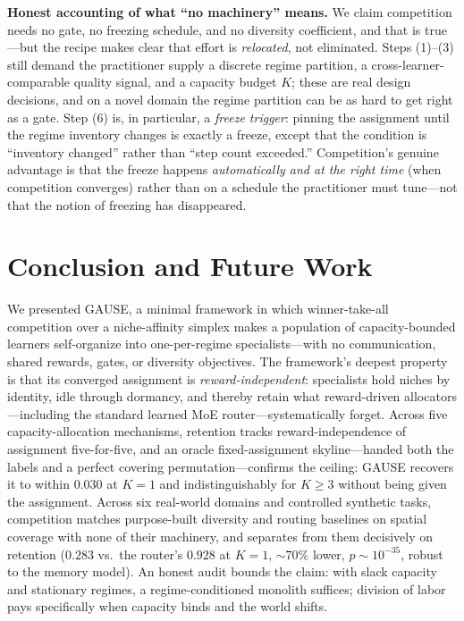 \documentclass[10pt]{article}
\begin{document}
\noindent\textbf{Honest accounting of what ``no machinery'' means.} We claim
competition needs no gate, no freezing schedule, and no diversity coefficient, and
that is true---but the recipe makes clear that effort is \emph{relocated}, not
eliminated. Steps (1)--(3) still demand the practitioner supply a discrete regime
partition, a cross-learner-comparable quality signal, and a capacity budget $K$;
these are real design decisions, and on a novel domain the regime partition can be as
hard to get right as a gate. Step (6) is, in particular, a \emph{freeze trigger}:
pinning the assignment until the regime inventory changes is exactly a freeze, except
that the condition is ``inventory changed'' rather than ``step count exceeded.''
Competition's genuine advantage is that the freeze happens \emph{automatically and at
the right time} (when competition converges) rather than on a schedule the
practitioner must tune---not that the notion of freezing has disappeared.

\section{Conclusion and Future Work}
\label{sec:conclusion}

We presented GAUSE, a minimal framework in which winner-take-all
competition over a niche-affinity simplex makes a population of capacity-bounded
learners self-organize into one-per-regime specialists---with no communication,
shared rewards, gates, or diversity objectives. The framework's deepest property
is that its converged assignment is \emph{reward-independent}: specialists hold
niches by identity, idle through dormancy, and thereby retain what reward-driven
allocators---including the standard learned MoE router---systematically forget.
Across five capacity-allocation mechanisms, retention tracks
reward-independence of assignment five-for-five, and an oracle fixed-assignment
skyline---handed both the labels and a perfect covering permutation---confirms the
ceiling: GAUSE recovers it to within $0.030$ at $K{=}1$ and indistinguishably for
$K\ge3$ without being given the assignment. Across six real-world domains
and controlled synthetic tasks, competition matches purpose-built diversity and
routing baselines on spatial coverage with none of their machinery, and
separates from them decisively on retention ($0.283$ vs.\ the router's $0.928$ at
$K{=}1$, $\sim$70\% lower, $p\sim10^{-35}$, robust to the memory model). An honest audit bounds the claim:
with slack capacity and stationary regimes, a regime-conditioned monolith
suffices; division of labor pays specifically when capacity binds and the world
shifts.
\end{document}
